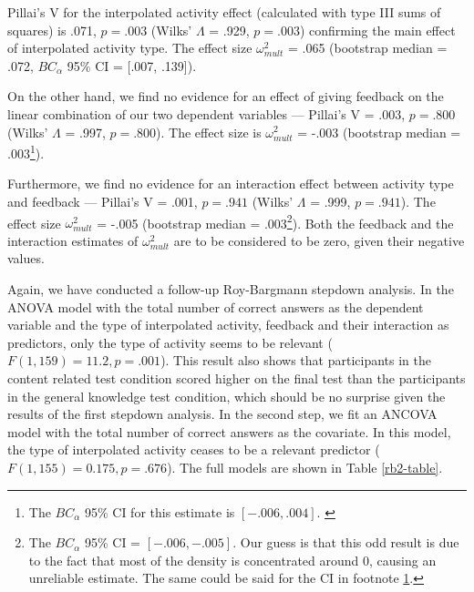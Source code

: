 \documentclass[11pt,]{article}
\let\rmarkdownfootnote\footnote%
\def\footnote{\protect\rmarkdownfootnote}
\begin{document}
Pillai's V for the interpolated activity effect (calculated with type
III sums of squares) is .071, \(p = .003\) (Wilks' \(\Lambda\) = .929,
\(p = .003\)) confirming the main effect of interpolated activity type.
The effect size \(\omega^2_{mult}\) = .065 (bootstrap median = .072,
\(BC_\alpha\) 95\% CI = {[}.007, .139{]}).

On the other hand, we find no evidence for an effect of giving feedback
on the linear combination of our two dependent variables --- Pillai's V
= .003, \(p = .800\) (Wilks' \(\Lambda\) = .997, \(p = .800\)). The
effect size is \(\omega^2_{mult}\) = -.003 (bootstrap median =
.003\footnote{
The \(BC_\alpha\) 95\% CI for this estimate is \([-.006,
.004]\).
\label{bca-ref}}).

Furthermore, we find no evidence for an interaction effect between
activity type and feedback --- Pillai's V = .001, \(p = .941\) (Wilks'
\(\Lambda\) = .999, \(p = .941\)). The effect size \(\omega^2_{mult}\) =
-.005 (bootstrap median = .003\footnote{
The \(BC_\alpha\) 95\% CI = \([-.006,
-.005]\).
Our guess is that this odd result is due to the fact that most of the density is concentrated
around 0, causing an unreliable estimate. The same could be said for the CI in
footnote \ref{bca-ref}.}). Both the feedback and the interaction
estimates of \(\omega^2_{mult}\) are to be considered to be zero, given
their negative values.

Again, we have conducted a follow-up Roy-Bargmann stepdown analysis. In
the ANOVA model with the total number of correct answers as the
dependent variable and the type of interpolated activity, feedback and
their interaction as predictors, only the type of activity seems to be
relevant (\(F(1, 159) = 11.2, p = .001\)). This result also shows that
participants in the content related test condition scored higher on the
final test than the participants in the general knowledge test
condition, which should be no surprise given the results of the first
stepdown analysis. In the second step, we fit an ANCOVA model with the
total number of correct answers as the covariate. In this model, the
type of interpolated activity ceases to be a relevant predictor
(\(F(1, 155) = 0.175, p = .676\)). The full models are shown in Table
\ref{rb2-table}.
\end{document}
